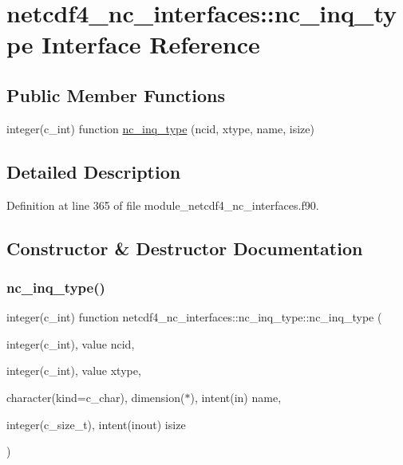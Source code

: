 \hypertarget{interfacenetcdf4__nc__interfaces_1_1nc__inq__type}{}\section{netcdf4\+\_\+nc\+\_\+interfaces\+:\+:nc\+\_\+inq\+\_\+type Interface Reference}
\label{interfacenetcdf4__nc__interfaces_1_1nc__inq__type}
\subsection*{Public Member Functions}
\begin{DoxyCompactItemize}
\item 
integer(c\+\_\+int) function \hyperlink{interfacenetcdf4__nc__interfaces_1_1nc__inq__type_a6a175084d5223b55579072e4930f11ed}{nc\+\_\+inq\+\_\+type} (ncid, xtype, name, isize)
\end{DoxyCompactItemize}


\subsection{Detailed Description}


Definition at line 365 of file module\+\_\+netcdf4\+\_\+nc\+\_\+interfaces.\+f90.



\subsection{Constructor \& Destructor Documentation}
\mbox{\label{interfacenetcdf4__nc__interfaces_1_1nc__inq__type_a6a175084d5223b55579072e4930f11ed}} 
\subsubsection{\texorpdfstring{nc\+\_\+inq\+\_\+type()}{nc\_inq\_type()}}
{\footnotesize\ttfamily integer(c\+\_\+int) function netcdf4\+\_\+nc\+\_\+interfaces\+::nc\+\_\+inq\+\_\+type\+::nc\+\_\+inq\+\_\+type (\begin{DoxyParamCaption}\item[{integer(c\+\_\+int), value}]{ncid,  }\item[{integer(c\+\_\+int), value}]{xtype,  }\item[{character(kind=c\+\_\+char), dimension($\ast$), intent(in)}]{name,  }\item[{integer(c\+\_\+size\+\_\+t), intent(inout)}]{isize }\end{DoxyParamCaption})}



